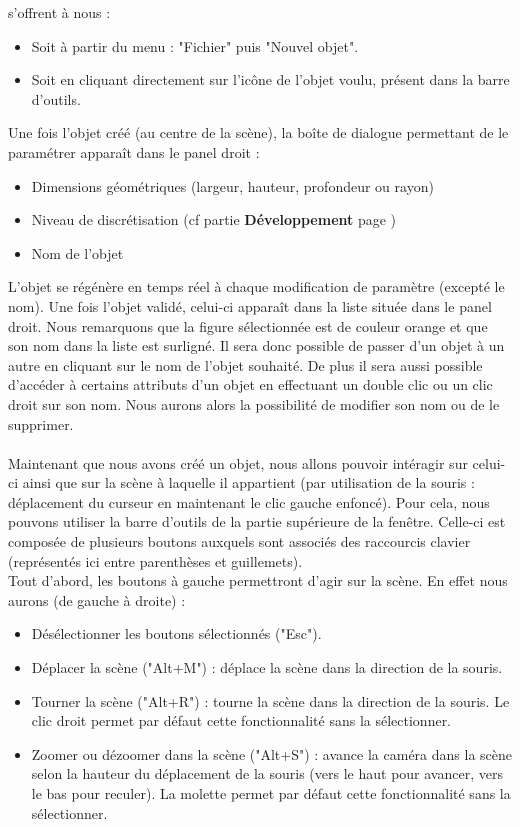 \documentclass[a4paper]{memoir}
\begin{document}
			s'offrent à nous :
			\begin{itemize}
				\item Soit à partir du menu : "Fichier" puis  "Nouvel objet".
				\item Soit en cliquant directement sur l'icône de l'objet voulu, présent dans la barre d'outils.
			\end{itemize}
			Une fois l'objet créé (au centre de la scène), la boîte de dialogue permettant de le paramétrer apparaît dans le panel droit :
			\begin{itemize}
				\item Dimensions géométriques (largeur, hauteur, profondeur ou rayon)
				\item Niveau de discrétisation (cf partie \textbf{Développement} page \pageref{mesh-dev})
				\item Nom de l'objet
			\end{itemize}
			L'objet se régénère en temps réel à chaque modification de paramètre (excepté le nom). Une fois l'objet validé, celui-ci apparaît dans la liste 
			située dans le panel droit. Nous remarquons que la figure sélectionnée est de couleur orange et que son nom dans la liste est surligné. Il sera 
			donc possible de passer d'un objet à un autre en cliquant sur le nom de l'objet souhaité. De plus il sera aussi possible d'accéder à certains 
			attributs d'un objet en effectuant un double clic ou un clic droit sur son nom. Nous aurons alors la possibilité de modifier son nom ou de le 
			supprimer.\\\\ 
			Maintenant que nous avons créé un objet, nous allons pouvoir intéragir sur celui-ci ainsi que sur la scène à laquelle il appartient (par 
			utilisation de la souris : déplacement du curseur en maintenant le clic gauche enfoncé). Pour cela, nous pouvons utiliser la barre d'outils de 
			la partie supérieure de la fenêtre. Celle-ci est composée de plusieurs boutons auxquels sont associés des raccourcis clavier (représentés ici 
			entre parenthèses et guillemets).\\
			Tout d'abord, les boutons à gauche permettront d'agir sur la  scène. En effet nous aurons (de gauche à droite) : 
			\begin{itemize}
				\item Désélectionner les boutons sélectionnés ("Esc").
				\item Déplacer la scène ("Alt+M") : déplace la scène dans la direction de la souris.
				\item Tourner la scène ("Alt+R") : tourne la scène dans la direction de la souris. Le clic droit permet par défaut cette fonctionnalité sans 
				la sélectionner.
				\item Zoomer ou dézoomer dans la scène ("Alt+S") : avance la caméra dans la scène selon la hauteur du déplacement de la souris (vers le haut 
				pour avancer, vers le bas pour reculer). La molette permet par défaut cette fonctionnalité sans la sélectionner.
			\end{itemize}
\end{document}
